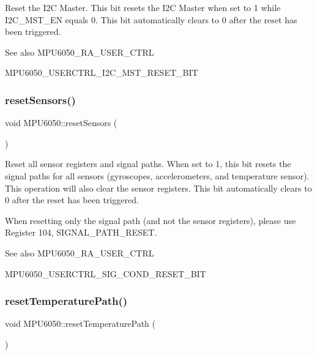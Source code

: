 Reset the I2C Master. This bit resets the I2C Master when set to 1 while I2\+C\+\_\+\+M\+S\+T\+\_\+\+EN equals 0. This bit automatically clears to 0 after the reset has been triggered. \begin{DoxySeeAlso}{See also}
M\+P\+U6050\+\_\+\+R\+A\+\_\+\+U\+S\+E\+R\+\_\+\+C\+T\+RL 

M\+P\+U6050\+\_\+\+U\+S\+E\+R\+C\+T\+R\+L\+\_\+\+I2\+C\+\_\+\+M\+S\+T\+\_\+\+R\+E\+S\+E\+T\+\_\+\+B\+IT 
\end{DoxySeeAlso}
\mbox{\label{class_m_p_u6050_a9a271104d3302abc4af005c69a930094}} 
\subsubsection{\texorpdfstring{resetSensors()}{resetSensors()}}
{\footnotesize\ttfamily void M\+P\+U6050\+::reset\+Sensors (\begin{DoxyParamCaption}{ }\end{DoxyParamCaption})}

Reset all sensor registers and signal paths. When set to 1, this bit resets the signal paths for all sensors (gyroscopes, accelerometers, and temperature sensor). This operation will also clear the sensor registers. This bit automatically clears to 0 after the reset has been triggered.

When resetting only the signal path (and not the sensor registers), please use Register 104, S\+I\+G\+N\+A\+L\+\_\+\+P\+A\+T\+H\+\_\+\+R\+E\+S\+ET.

\begin{DoxySeeAlso}{See also}
M\+P\+U6050\+\_\+\+R\+A\+\_\+\+U\+S\+E\+R\+\_\+\+C\+T\+RL 

M\+P\+U6050\+\_\+\+U\+S\+E\+R\+C\+T\+R\+L\+\_\+\+S\+I\+G\+\_\+\+C\+O\+N\+D\+\_\+\+R\+E\+S\+E\+T\+\_\+\+B\+IT 
\end{DoxySeeAlso}
\mbox{\label{class_m_p_u6050_a559c2d091d36a4e0489bc639916ddbb6}} 
\subsubsection{\texorpdfstring{resetTemperaturePath()}{resetTemperaturePath()}}
{\footnotesize\ttfamily void M\+P\+U6050\+::reset\+Temperature\+Path (\begin{DoxyParamCaption}{ }\end{DoxyParamCaption})}

